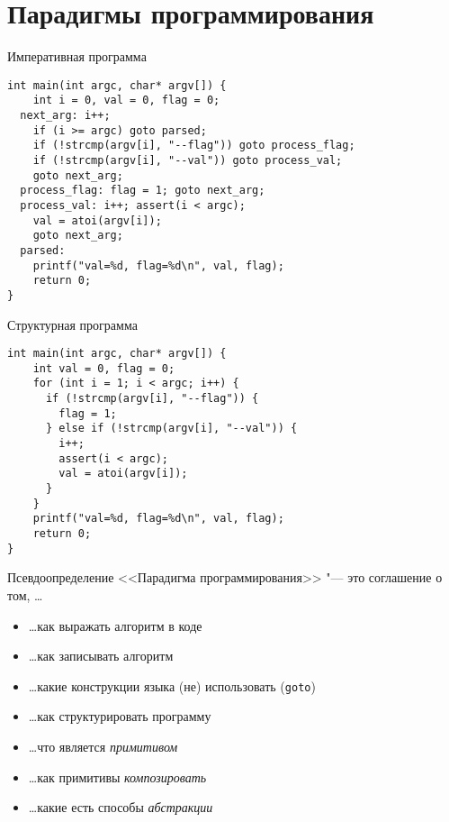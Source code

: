 \section{Парадигмы программирования}
\begin{frame}[t,fragile]{Императивная программа}
\begin{verbatim}
int main(int argc, char* argv[]) {
    int i = 0, val = 0, flag = 0;
  next_arg: i++;
    if (i >= argc) goto parsed;
    if (!strcmp(argv[i], "--flag")) goto process_flag;
    if (!strcmp(argv[i], "--val")) goto process_val;
    goto next_arg;
  process_flag: flag = 1; goto next_arg;
  process_val: i++; assert(i < argc);
    val = atoi(argv[i]);
    goto next_arg;
  parsed:
    printf("val=%d, flag=%d\n", val, flag);
    return 0;
}
\end{verbatim}
\end{frame}

\begin{frame}[t,fragile]{Структурная программа}
\begin{verbatim}
int main(int argc, char* argv[]) {
    int val = 0, flag = 0;
    for (int i = 1; i < argc; i++) {
      if (!strcmp(argv[i], "--flag")) {
        flag = 1;
      } else if (!strcmp(argv[i], "--val")) {
        i++;
        assert(i < argc);
        val = atoi(argv[i]);
      }
    }
    printf("val=%d, flag=%d\n", val, flag);
    return 0;
}
\end{verbatim}
\end{frame}

\begin{frame}[t,fragile]{Псевдоопределение}
	<<Парадигма программирования>> "--- это соглашение о том, \ldots
	\begin{itemize}
	\item \ldots как выражать алгоритм в коде
	\item \ldots как записывать алгоритм
	\item \ldots какие конструкции языка (не) использовать (\verb!goto!)
	\item \ldots как структурировать программу
	\item \ldots что является \textit{примитивом}
	\item \ldots как примитивы \textit{композировать}
	\item \ldots какие есть способы \textit{абстракции}
	\end{itemize}
\end{frame}

